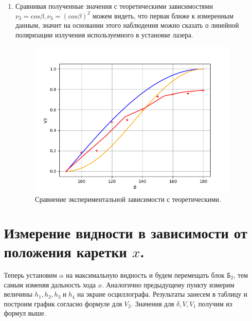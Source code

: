 \documentclass[a4paper,12pt]{article}
\begin{document}
\begin{enumerate}
\item Сравнивая полученные значения с теоретическими зависимостями $\nu_3 = cos\beta , \nu_3 = (cos\beta )^2$ можем видеть, что первая ближе к измеренным данным, значит на основании этого наблюдения можно сказать о линейной поляризации излучения используемного в установке лазера.
  
  \begin{figure}[H]
  \begin{center}
    \includegraphics[width=13cm]{gra2.png}
    \caption{Сравнение экспериментальной зависимости с теоретическими.}
    \label{fig:}
  \end{center}
\end{figure}

\end{enumerate}


\section{Измерение видности в зависимости от положения каретки  $x$.} 
Теперь установим $ \alpha $ на максимальную видность и будем перемещать блок $ Б_2 $, тем самым изменяя дальность хода $ x $. Аналогично предыдущему пункту измерим величины $ h_1, h_2, h_3 \; и \; h_4 $ на экране осциллографа. Результаты занесем в таблицу и построим график согласно формуле для $V_2$. Значения для $ \delta, V, V_1 $ получим из формул выше.
\end{document}
